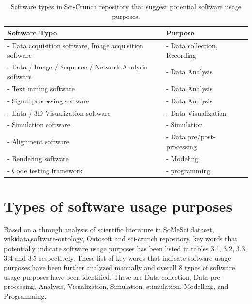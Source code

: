 \begin{table}[h!]
	\begin{center}
		\caption{Software types in Sci-Crunch repository that suggest potential software usage purposes.}
		\label{tab:table1}
		\begin{tabular}{|l|l|} %
			\hline
			\textbf{Software Type} & \textbf{Purpose} \\
			\hline
			- Data acquisition software, Image acquisition software  & - Data collection, Recording  \\
			\hline
			- Data / Image  / Sequence  / Network  Analysis software  & - Data Analysis  \\
			\hline
			- Text mining software  & - Data Analysis  \\
			\hline
			- Signal processing software  & - Data Analysis  \\
			\hline
			- Data / 3D Visualization software & - Data Visualization  \\
			\hline
			- Simulation software  & - Simulation  \\
			\hline
			- Alignment software  & - Data pre/post-processing \\
			\hline
			- Rendering software  & - Modeling  \\
			\hline
			-	Code testing framework   & - programming  \\
			\hline
		\end{tabular}
	\end{center}
\end{table}


\section{Types of software usage purposes }
\label{sec:purpose:Types}

Based on a through analysis of scientific literature in \ac{SoMeSci} dataset, wikidata,software-ontology, Ontosoft and sci-crunch repository, key words that potentially indicate software usage purposes has been listed in tables 3.1, 3.2, 3.3, 3.4 and 3.5 respectively. These list of key words that indicate software usage purposes have been further analyzed manually and overall 8 types of software usage purposes have been identified. These are Data collection,  Data pre-processing, Analysis, Visualization, Simulation, stimulation, Modelling, and Programming. \\

